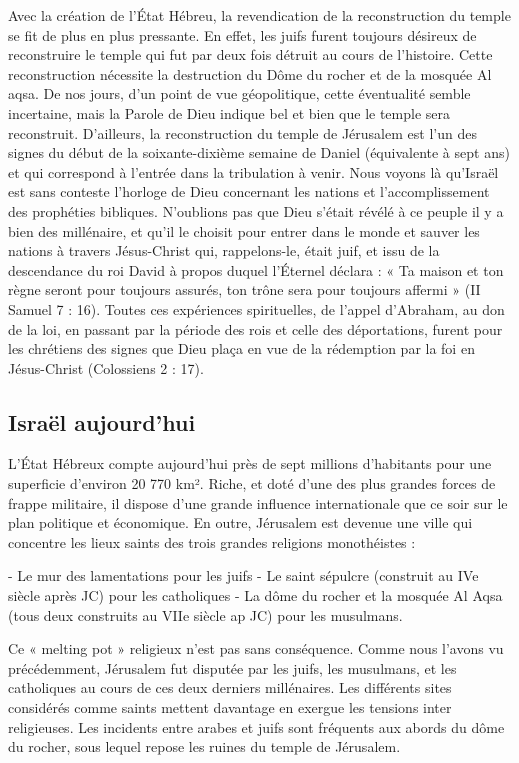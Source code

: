 Avec la création de l’État Hébreu, la revendication de la reconstruction du temple se fit de plus en plus pressante.
En effet, les juifs furent toujours désireux de reconstruire le temple qui fut par deux fois détruit au cours de l'histoire. Cette reconstruction nécessite la destruction du Dôme du rocher et de la mosquée Al aqsa. De nos jours, d'un point de vue géopolitique, cette éventualité semble incertaine, mais la Parole de Dieu indique bel et bien que le temple sera reconstruit. D'ailleurs, la reconstruction du temple de Jérusalem est l'un des signes du début de la soixante-dixième semaine de Daniel (équivalente à sept ans) et qui correspond à l'entrée dans la tribulation à venir. Nous voyons là qu'Israël est sans conteste l'horloge de Dieu concernant les nations et l'accomplissement des prophéties bibliques. N'oublions pas que Dieu s'était révélé à ce peuple il y a bien des millénaire, et qu'il le choisit pour entrer dans le monde et sauver les nations à travers Jésus-Christ qui, rappelons-le, était juif, et issu de la descendance du roi David à propos duquel l’Éternel déclara : « Ta maison et ton règne seront pour toujours assurés, ton trône sera pour toujours affermi » (II Samuel 7 : 16).
Toutes ces expériences spirituelles, de l'appel d'Abraham, au don de la loi, en passant par la période des rois et celle des déportations, furent pour les chrétiens des signes que Dieu plaça en vue de la rédemption par la foi en Jésus-Christ (Colossiens 2 : 17).

\subsection*{Israël aujourd'hui}

L’État Hébreux compte aujourd'hui près de sept millions d'habitants pour une superficie d'environ 20 770 km². Riche, et doté d'une des plus grandes forces de frappe militaire, il dispose d'une grande influence internationale que ce soir sur le plan politique et économique.
En outre, Jérusalem est devenue une ville qui concentre les lieux saints des trois grandes religions monothéistes :

- Le mur des lamentations pour les juifs
- Le saint sépulcre (construit au IVe siècle après JC) pour les catholiques
- La dôme du rocher et la mosquée Al Aqsa (tous deux construits au VIIe siècle ap JC) pour les musulmans.

Ce « melting pot » religieux n'est pas sans conséquence. Comme nous l'avons vu précédemment, Jérusalem fut disputée par les juifs, les musulmans, et les catholiques au cours de ces deux derniers millénaires. Les différents sites considérés comme saints mettent davantage en exergue les tensions inter religieuses. Les incidents entre arabes et juifs sont fréquents aux abords du dôme du rocher, sous lequel repose les ruines du temple de Jérusalem.

